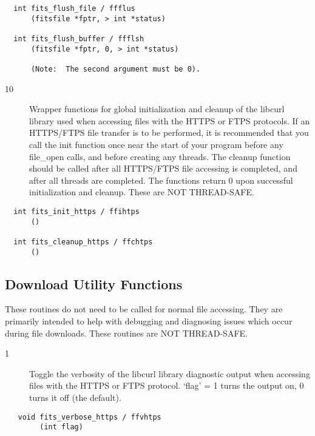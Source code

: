 \documentclass[11pt]{book}
\begin{document}
\begin{verbatim}
  int fits_flush_file / ffflus
      (fitsfile *fptr, > int *status)

  int fits_flush_buffer / ffflsh
      (fitsfile *fptr, 0, > int *status)

      (Note:  The second argument must be 0).
\end{verbatim}

\begin{description}
\item[10 ] Wrapper functions for global initialization and cleanup of the libcurl library used
   when accessing files with the HTTPS or FTPS protocols.  If an HTTPS/FTPS file transfer is to
   be performed, it is recommended that you call the init function once near the start of your 
   program before any file\_open calls, and before creating any threads. The cleanup function
   should be called after all HTTPS/FTPS file accessing is completed, and after all threads are 
   completed.  The functions return 0 upon successful initialization and cleanup.  These
   are NOT THREAD-SAFE.    
  \label{ffihtps}
\end{description}

\begin{verbatim}
  int fits_init_https / ffihtps
      ()
      
  int fits_cleanup_https / ffchtps
      ()
\end{verbatim}

\subsection{Download Utility Functions}

These routines do not need to be called for normal file accessing. They are
primarily intended to help with debugging and diagnosing issues which occur 
during file downloads.  These routines are NOT THREAD-SAFE.

\begin{description}
\item[1 ] Toggle the verbosity of the libcurl library diagnostic output when
   accessing files with the HTTPS or FTPS protocol.  `flag' = 1 turns the output
   on, 0 turns it off (the default).
  \label{ffvhtps}
\end{description}

\begin{verbatim}
   void fits_verbose_https / ffvhtps
        (int flag)
\end{verbatim}
\end{document}
